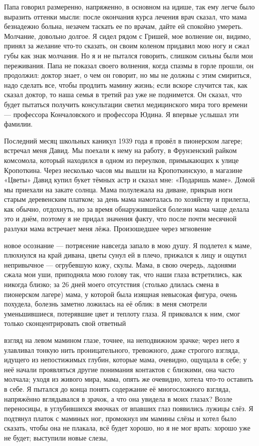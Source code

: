 \label{181-1}
Папа говорил размеренно, напряженно, в основном на идише, так ему легче было выразить оттенки мысли: после окончания курса лечения врач сказал, что мама безнадежно больна, незачем таскать ее по врачам, дайте ей спокойно умереть. Молчание, довольно долгое. Я сидел рядом с Гришей, мое волнение он, видимо, принял за желание что-то сказать, он своим коленом придавил мою ногу и сжал губы как знак молчания. Но я и не пытался говорить, слишком сильны были мои переживания. Папа не показал своего волнения, когда спазмы в горле прошли, он продолжил: доктор знает, о чем он говорит, но мы не должны с этим смириться, надо сделать все, чтобы продлить мамину жизнь; если вскоре случится так, как сказал доктор, то наша семья в третий раз уже не поднимется. Он сказал, что будет пытаться получить консультации светил медицинского мира того времени — профессора Кончаловского и профессора Юдина. Я впервые услышал эти фамилии.

\label{182-1}
Последний месяц школьных каникул 1939 года я провёл в пионерском лагере; встречал меня Давид. Мы поехали к нему на работу, в Фрунзенский райком комсомола, который находился в одном из переулков, примыкающих к улице Кропоткина. Через несколько часов мы вышли на Кропоткинскую, в магазине «Цветы» Давид купил букет тёмных астр и сказал мне: «Подаришь маме». Домой мы приехали на закате солнца. Мама полулежала на диване, прикрыв ноги старым деревенским платком; за день мама намоталась по хозяйству и прилегла, как обычно, отдохнуть, но за время обнаружившейся болезни мама чаще делала это и днём, поэтому я не придал значения факту, что после почти месячной разлуки мама встречает меня лёжа. Произошедшее через мгновение

\label{183-1}
новое осознание — потрясение навсегда запало в мою душу.
Я подлетел к маме, плюхнулся на край дивана, цветы сунул ей в плечо, прижался к лицу и ощутил непривычное — огрубевшую кожу, скулы. Мама, в свою очередь, ладонями сжала мои уши, приподняла мою голову так, что наши глаза встретились, как никогда близко; за 26 дней моего отсутствия (столько длилась смена в пионерском лагере) мама, у которой была изящная невысокая фигура, очень похудела, болезнь заметно ложилась на её облик: в меня смотрели уменьшившиеся, потерявшие цвет и теплоту глаза. Я приковался к ним, смог только сконцентрировать свой ответный

\label{184-1}
взгляд на левом мамином глазе, точнее, на неподвижном зрачке; через него я улавливал тонкую нить проницательного, тревожного, даже строгого взгляда, идущего из непостижимых глубин, которые мама, очевидно, ощущала в себе; у неё начали проявляться другие понимания контактов с близкими, она часто молчала; уходя из живого мира, мама, опять же очевидно, хотела что-то оставить в себе. Я пытался до конца понять содержание её многосложного взгляда, напряжённо вглядывался в зрачок, а что она увидела в моих глазах? Возле переносицы, в углубившихся ямочках от впавших глаз появились лужицы слёз. Я подтянул платок с маминых ног, промокнул им мамины слёзы и хотел было сказать, чтобы она не плакала, всё будет хорошо, но я не мог врать: хорошо уже не будет; выступили новые слезы,

